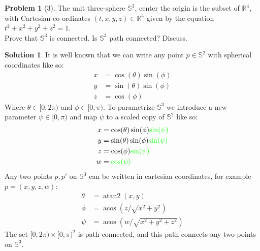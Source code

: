 \documentclass{article}
\theoremstyle{definition}
\newtheorem*{soln}{Solution}
\newtheorem*{prob}{Problem}
\theoremstyle{theorem}
\renewcommand{\S}{\mathbb{S}}
\newcommand{\atan}{\operatorname{atan2}}
\newcommand{\acos}{\operatorname{acos}}
\begin{document}
\begin{prob}[3]
The unit three-sphere $\mathbb{S}^3$, center the origin is the subset of $\mathbb{R}^4$, with Cartesian co-ordinates $(t, x, y, z) \in \mathbb{R}^4$ given by the equation $t^2 + x^2 + y^2 + z^2 = 1$.  \\Prove that $\mathbb{S}^3$ is connected.  Is $\mathbb{S}^3$ path connected?  Discuss.
\end{prob}
\begin{soln}
    It is well known that we can write any point  $p\in \S^2$ with spherical coordinates like so:
    \begin{align*}
        x&= \cos(\theta)\sin(\phi)\\
        y&=\sin(\theta)\sin(\phi)\\
        z&= \cos(\phi)
    \end{align*}
    Where $\theta\in [0,2\pi)$ and $\phi\in [0,\pi)$. To parametrize $\S^3$ we introduce a new parameter $\psi\in [0,\pi)$ and map  $\psi$ to a scaled copy of $\S^2$ like so:
    \begin{align*}
        x&= \cos(\theta)\sin(\phi)\textcolor{green}{\sin(\psi)}\\
        y&=\sin(\theta)\sin(\phi)\textcolor{green}{\sin(\psi)}\\
        z&= \cos(\phi)\textcolor{green}{\sin(\psi)}\\
        w&= \textcolor{green}{\cos(\psi)}
    \end{align*}
    Any two points $p,p'$  on $\S^3$ can be written in cartesian coordinates, for example $p=(x,y,z,w)$:
    \begin{align*}
        \theta&= \atan(x,y)\\
        \phi &= \acos\left(z/\sqrt{x^2+y^2}\right)\\
        \psi &= \acos\left(w/\sqrt{x^2+y^2+z^2}\right)
    \end{align*}
    The set $[0,2\pi)\times[0,\pi)^2$ is path connected, and this path connects any two points on $\S^3$.  

\end{soln}
\vspace{1in}
\end{document}
